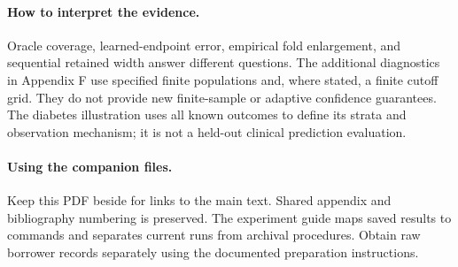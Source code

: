 \paragraph{How to interpret the evidence.}
Oracle coverage, learned-endpoint error, empirical fold enlargement, and sequential
retained width answer different questions. The additional diagnostics in Appendix F
use specified finite populations and, where stated, a finite cutoff grid. They do not
provide new finite-sample or adaptive confidence guarantees. The diabetes illustration
uses all known outcomes to define its strata and observation mechanism; it is not a
held-out clinical prediction evaluation.

\paragraph{Using the companion files.}
Keep this PDF beside  for links to the main text. Shared appendix and
bibliography numbering is preserved. The experiment guide maps saved results to commands
and separates current runs from archival procedures. Obtain raw borrower records
separately using the documented preparation instructions.
